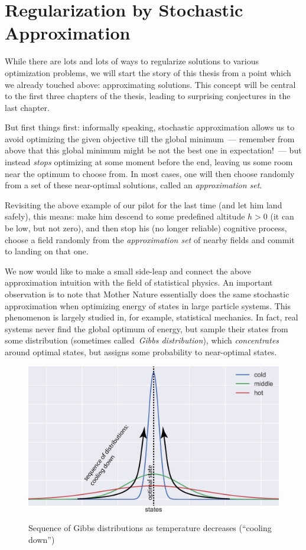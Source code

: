 \section{Regularization by Stochastic Approximation}

While there are lots and lots of ways to regularize solutions to various
optimization problems, we will start the story of this thesis from a point which
we already touched above: approximating solutions. This concept will be central
to the first three chapters of the thesis, leading to surprising conjectures in
the last chapter.

But first things first: informally speaking, stochastic approximation allows us
to avoid optimizing the given objective till the global minimum~--- remember
from above that this global minimum might be not the best one in
expectation!~--- but instead \textit{stops} optimizing at some moment before the
end, leaving us some room near the optimum to choose from. In most cases, one
will then choose randomly from a set of these near-optimal solutions, called an
\textit{approximation set}.

\myremark Revisiting the above example of our pilot for the last time (and let
him land safely), this means: make him descend to some predefined altitude $h >
0$ (it can be low, but not zero), and then stop his (no longer reliable)
cognitive process, choose a field randomly from the \textit{approximation set}
of nearby fields and commit to landing on that one.

We now would like to make a small side-leap and connect the above approximation
intuition with the field of statistical physics. An important observation is to
note that Mother Nature essentially does the same stochastic approximation when
optimizing energy of states in large particle systems. This phenomenon is
largely studied in, for example, statistical mechanics. In fact, real systems
never find the global optimum of energy, but sample their states from some
distribution (sometimes called~\textit{Gibbs distribution}), which
\textit{concentrates} around optimal states, but assigns some probability to
near-optimal states.

\begin{figure}[t]
    \centering
    \includegraphics[width=.8\textwidth]{figures/ch_introduction/gibbs_cooling}
    \\[.5cm]
    \caption{Sequence of Gibbs distributions as temperature decreases (``cooling down'')}
    \label{fig:introduction_gibbs_cooling}
\end{figure}

